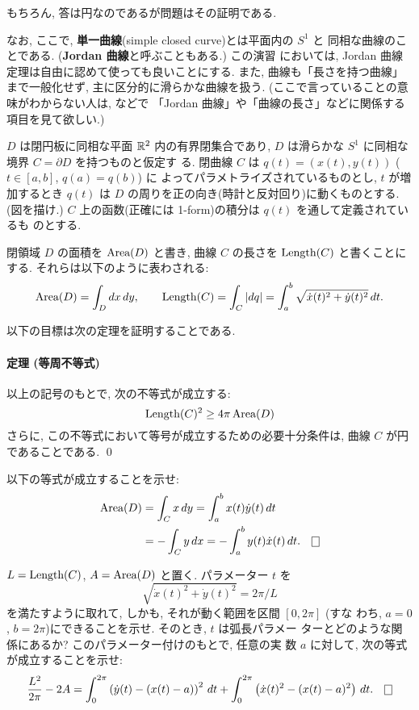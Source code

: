 \documentclass[12pt,twoside]{jarticle}
\def\Area{\mathop{\text{\rm Area}}\nolimits}
\def\Length{\mathop{\text{\rm Length}}\nolimits}
\def\R{{\Bbb R}} %
\begin{document}
もちろん, 答は円なのであるが問題はその証明である. 

なお, ここで, {\bf 単一曲線}(simple closed curve)とは平面内の $S^1$ と
同相な曲線のことである. ({\bf Jordan 曲線}と呼ぶこともある.) この演習
においては, Jordan 曲線定理は自由に認めて使っても良いことにする. また, 
曲線も「長さを持つ曲線」まで一般化せず, 主に区分的に滑らかな曲線を扱う.
(ここで言っていることの意味がわからない人は, \cite{jiten}{} などで 
「Jordan 曲線」や「曲線の長さ」などに関係する項目を見て欲しい.)

$D$ は閉円板に同相な平面 $\R^2$ 内の有界閉集合であり, %
$D$ は滑らかな $S^1$ に同相な境界 $C = \partial D$ を持つものと仮定す
る. 閉曲線 $C$ は $q(t) = (x(t), y(t))$ ($t\in [a,b]$, $q(a)=q(b)$) に
よってパラメトライズされているものとし, $t$ が増加するとき $q(t)$ は 
$D$ の周りを正の向き(時計と反対回り)に動くものとする. (図を描け.) %
$C$ 上の函数(正確には 1-form)の積分は $q(t)$ を通して定義されているも
のとする.

閉領域 $D$ の面積を $\Area(D)$ と書き, 曲線 $C$ の長さを $\Length(C)$ %
と書くことにする. それらは以下のように表わされる:
\[
  \Area(D)
  = \int_D dx\,dy,
  \qquad
  \Length(C)
  = \int_C |dq|
  = \int_a^b \sqrt{\dot{x}(t)^2 + \dot{y}(t)^2}\,dt.
\]

以下の目標は次の定理を証明することである.

\paragraph{定理 (等周不等式)} 以上の記号のもとで, 次の不等式が成立する:
\[
    \Length(C)^2 \ge 4\pi \Area(D)
\]%
さらに, この不等式において等号が成立するための必要十分条件は, 曲線 $C$ 
が円であることである.  \qed

\begin{question}\label{q:area}
  以下の等式が成立することを示せ:
  \begin{align*}
    \Area(D)
    & =   \int_C x\,dy =   \int_a^b x(t) \dot{y}(t) \,dt
    \\
    & = - \int_C y\,dx = - \int_a^b y(t) \dot{x}(t) \,dt.
  \qed
  \end{align*}
\end{question}

\begin{question}\label{q:length-area}
  $L = \Length(C)$, $A = \Area(D)$ と置く. パラメーター $t$ を
  \[
    \sqrt{\dot{x}(t)^2 + \dot{y}(t)^2} = 2\pi/L
  \]%
  を満たすように取れて, しかも, それが動く範囲を区間 $[0,2\pi]$ (すな
  わち, $a=0$, $b=2\pi$)にできることを示せ. そのとき, $t$ は弧長パラメー
  ターとどのような関係にあるか? このパラメーター付けのもとで, 任意の実
  数 $a$ に対して, 次の等式が成立することを示せ:
  \[
    \frac{L^2}{2\pi} - 2 A
    = \int_0^{2\pi} \left( \dot{y}(t) - (x(t) - a) \right)^2  \,dt
    + \int_0^{2\pi} \left( \dot{x}(t)^2 - (x(t) - a)^2 \right)\,dt.
  \qed
  \]
\end{question}
\end{document}

